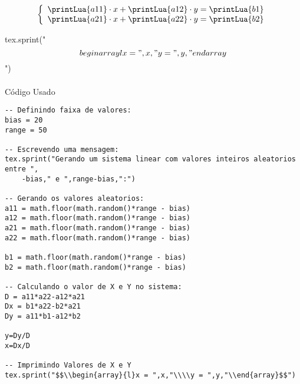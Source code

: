 \documentclass{article}
\begin{document}
\begin{equation}
\left\{
\begin{array}{l}
\printLua{a11}\cdot x + \printLua{a12} \cdot y = \printLua{b1}\\
\printLua{a21}\cdot x + \printLua{a22} \cdot y = \printLua{b2}\\
\end{array}
\right.
\end{equation}

\begin{luacode}
tex.sprint("$$\\begin{array}{l}x = ",x,"\\\\y = ",y,"\\end{array}$$")
\end{luacode}

\paragraph{}Código Usado

\begin{verbatim}
-- Definindo faixa de valores:
bias = 20
range = 50 

-- Escrevendo uma mensagem:
tex.sprint("Gerando um sistema linear com valores inteiros aleatorios entre ",
    -bias," e ",range-bias,":")

-- Gerando os valores aleatorios:
a11 = math.floor(math.random()*range - bias)
a12 = math.floor(math.random()*range - bias)
a21 = math.floor(math.random()*range - bias)
a22 = math.floor(math.random()*range - bias)

b1 = math.floor(math.random()*range - bias)
b2 = math.floor(math.random()*range - bias)

-- Calculando o valor de X e Y no sistema:
D = a11*a22-a12*a21
Dx = b1*a22-b2*a21
Dy = a11*b1-a12*b2

y=Dy/D
x=Dx/D

-- Imprimindo Valores de X e Y
tex.sprint("$$\\begin{array}{l}x = ",x,"\\\\y = ",y,"\\end{array}$$")
\end{verbatim}
\end{document}
